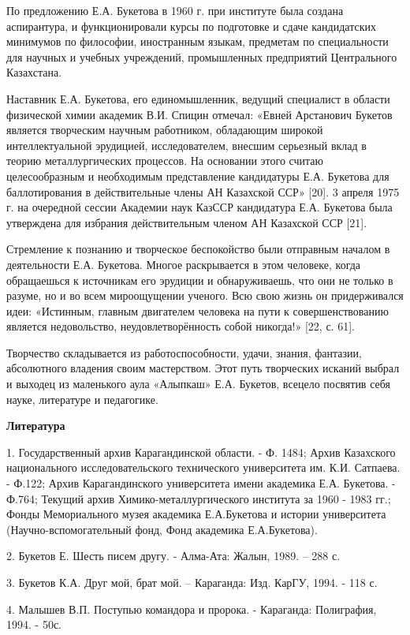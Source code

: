 По предложению Е.А. Букетова в 1960 г. при институте была создана
аспирантура, и функционировали курсы по подготовке и сдаче кандидатских
минимумов по философии, иностранным языкам, предметам по специальности
для научных и учебных учреждений, промышленных предприятий Центрального
Казахстана.

Наставник Е.А. Букетова, его единомышленник, ведущий специалист в
области физической химии академик В.И. Спицин отмечал: «Евней Арстанович
Букетов является творческим научным работником, обладающим широкой
интеллектуальной эрудицией, исследователем, внесшим серьезный вклад в
теорию металлургических процессов. На основании этого считаю
целесообразным и необходимым представление кандидатуры Е.А. Букетова для
баллотирования в действительные члены АН Казахской ССР» {[}20{]}. 3
апреля 1975 г. на очередной сессии Академии наук КазССР кандидатура Е.А.
Букетова была утверждена для избрания действительным членом АН Казахской
ССР {[}21{]}.

Стремление к познанию и творческое беспокойство были отправным началом в
деятельности Е.А. Букетова. Многое раскрывается в этом человеке, когда
обращаешься к источникам его эрудиции и обнаруживаешь, что они не только
в разуме, но и во всем мироощущении ученого. Всю свою жизнь он
придерживался идеи: «Истинным, главным двигателем человека на пути к
совершенствованию является недовольство, неудовлетворённость собой
никогда!» {[}22, с. 61{]}.

Творчество складывается из работоспособности, удачи, знания, фантазии,
абсолютного владения своим мастерством. Этот путь творческих исканий
выбрал и выходец из маленького аула «Алыпкаш» Е.А. Букетов, всецело
посвятив себя науке, литературе и педагогике.

{\bfseries Литература}

1. Государственный архив Карагандинской области. - Ф. 1484; Архив
Казахского национального исследовательского технического университета
им. К.И. Сатпаева. - Ф.122; Архив Карагандинского университета имени
академика Е.А. Букетова. - Ф.764; Текущий архив Химико-металлургического
института за 1960 - 1983 гг.; Фонды Мемориального музея академика
Е.А.Букетова и истории университета (Научно-вспомогательный фонд, Фонд
академика Е.А.Букетова).

2. Букетов Е. Шесть писем другу. - Алма-Ата: Жалын, 1989. -- 288 с.

3. Букетов К.А. Друг мой, брат мой. -- Караганда: Изд. КарГУ, 1994. -
118 с.

4. Малышев В.П. Поступью командора и пророка. - Караганда: Полиграфия,
1994. - 50с.

